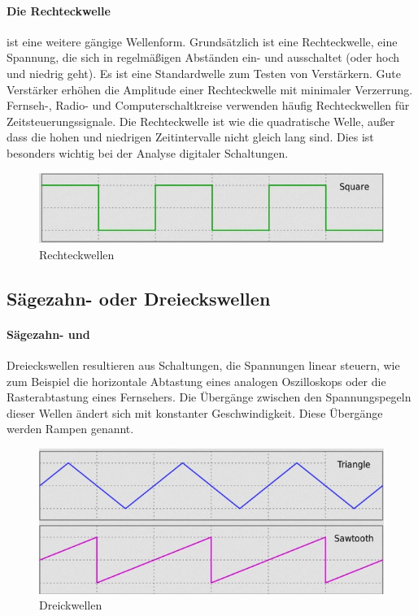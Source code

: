\documentclass{article}
\begin{document}
\paragraph{Die Rechteckwelle}
ist eine weitere gängige Wellenform. Grundsätzlich ist eine Rechteckwelle, eine Spannung, die sich in regelmäßigen Abständen ein- und ausschaltet (oder hoch und niedrig geht). Es ist eine Standardwelle zum Testen von Verstärkern. Gute Verstärker erhöhen die Amplitude einer Rechteckwelle mit minimaler Verzerrung.
Fernseh-, Radio- und Computerschaltkreise verwenden häufig Rechteckwellen für Zeitsteuerungssignale. Die Rechteckwelle ist wie die quadratische Welle, außer dass die hohen und niedrigen Zeitintervalle nicht gleich lang sind. Dies ist besonders wichtig bei der Analyse digitaler Schaltungen.\cite{basics}
\begin{figure}[H]
  \includegraphics[width=\textwidth]{"SquareWave"}
  \caption[\textbf{SquareWave.jpg},  Quelle:https://en.wikipedia.org/wiki/Waveform (zuletzt abgerufen: 04.09.2021)]{Rechteckwellen}
\end{figure}
\newline
\subsection{Sägezahn- oder Dreieckswellen}
\paragraph{Sägezahn- und}
Dreieckswellen resultieren aus Schaltungen, die Spannungen linear steuern, wie zum Beispiel die horizontale Abtastung eines analogen Oszilloskops oder die Rasterabtastung eines Fernsehers.
Die Übergänge zwischen den Spannungspegeln dieser Wellen ändert sich mit konstanter Geschwindigkeit. Diese Übergänge werden Rampen genannt.\cite{basics}
\begin{figure}[H]
  \includegraphics[width=\textwidth]{"TriangleSawWave"}
  \caption[\textbf{TriangleSawWave.jpg},  Quelle:https://en.wikipedia.org/wiki/Waveform (zuletzt abgerufen: 04.09.2021)]{Dreickwellen}
\end{figure}
\newline
\end{document}
